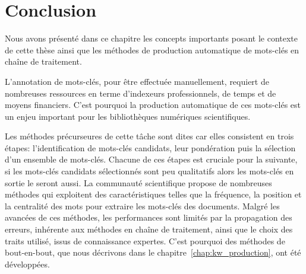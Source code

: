 \section{Conclusion}

Nous avons présenté dans ce chapitre les concepts importants posant le contexte de cette thèse ainsi que les méthodes de production automatique de mots-clés en chaîne de traitement.

L'annotation de mots-clés, pour être effectuée manuellement, requiert de nombreuses ressources en terme d'indexeurs professionnels, de temps et de moyens financiers.
C'est pourquoi la production automatique de ces mots-clés est un enjeu important pour les bibliothèques numériques scientifiques.

Les méthodes précurseures de cette tâche sont dites  car elles consistent en trois étapes: l'identification de mots-clés candidats, leur pondération puis la sélection d'un ensemble de mots-clés.
Chacune de ces étapes est cruciale pour la suivante, si les mots-clés candidats sélectionnés sont peu qualitatifs alors les mots-clés en sortie le seront aussi.
La communauté scientifique propose de nombreuses méthodes qui exploitent des caractéristiques telles que la fréquence, la position et la centralité des mots pour extraire les mots-clés des documents.
Malgré les avancées de ces méthodes, les performances sont limités par la propagation des erreurs, inhérente aux méthodes en chaîne de traitement, ainsi que le choix des traits utilisé, issus de connaissance expertes.
C'est pourquoi des méthodes de bout-en-bout, que nous décrivons dans le chapitre~\ref{chap:kw_production}, ont été développées.